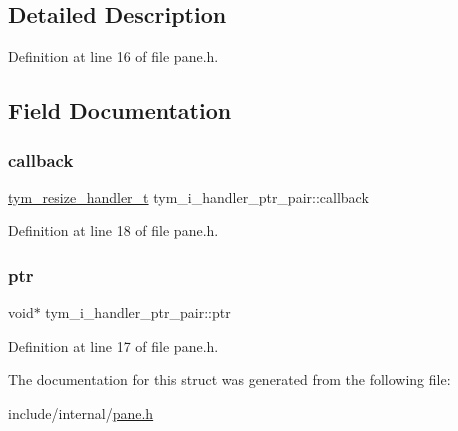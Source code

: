 \subsection{Detailed Description}


Definition at line 16 of file pane.\+h.



\subsection{Field Documentation}
\mbox{\label{structtym__i__handler__ptr__pair_a2e8f24a33817fd8af89b9279f252fc8d}} 
\subsubsection{\texorpdfstring{callback}{callback}}
{\footnotesize\ttfamily \hyperlink{libttymultiplex_8h_a7b785cb846faa92e5f2f5fbf32bdcde4}{tym\+\_\+resize\+\_\+handler\+\_\+t} tym\+\_\+i\+\_\+handler\+\_\+ptr\+\_\+pair\+::callback}



Definition at line 18 of file pane.\+h.

\mbox{\label{structtym__i__handler__ptr__pair_a9cc2f422ffb3ed953f009d03ca5477bb}} 
\subsubsection{\texorpdfstring{ptr}{ptr}}
{\footnotesize\ttfamily void$\ast$ tym\+\_\+i\+\_\+handler\+\_\+ptr\+\_\+pair\+::ptr}



Definition at line 17 of file pane.\+h.



The documentation for this struct was generated from the following file\+:\begin{DoxyCompactItemize}
\item 
include/internal/\hyperlink{pane_8h}{pane.\+h}\end{DoxyCompactItemize}
